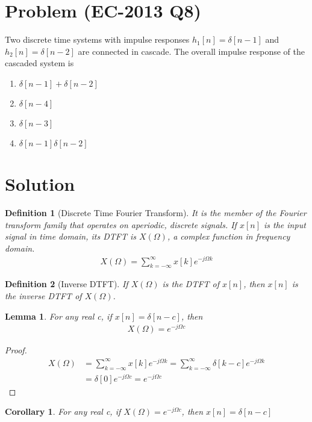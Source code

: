 \documentclass[journal,12pt,twocolumn]{IEEEtran}
\newtheorem{corollary}{Corollary}[theorem]
\newtheorem{lemma}[theorem]{Lemma}
\newtheorem{definition}{Definition}[section]
\begin{document}
\section{Problem (EC-2013 Q8)}
Two discrete time systems with impulse responses $h_1[n]=\delta[n-1]$ and $h_2[n]=\delta[n-2]$ are connected in cascade. The overall impulse response of the cascaded system is
\begin{enumerate}
    \item $\delta[n-1]+\delta[n-2]$
    \item $\delta[n-4]$
    \item $\delta[n-3]$
    \item $\delta[n-1]\delta[n-2]$
\end{enumerate}
\section{Solution}
\begin{definition}[Discrete Time Fourier Transform]
It is the member of the Fourier transform family that operates on aperiodic, discrete signals. If $x[n]$ is the input signal in time domain, its DTFT is $X(\Omega)$, a complex function in frequency domain.
\begin{align}
    X(\Omega)=\displaystyle\sum_{k=-\infty}^{\infty}x[k]e^{-j\Omega k} 
\end{align}
\end{definition}
\begin{definition}[Inverse DTFT]
If $X(\Omega)$ is the DTFT of $x[n]$, then $x[n]$ is the inverse DTFT of $X(\Omega)$.
\end{definition}
\begin{lemma}
For any real c, if $x[n]=\delta[n-c]$, then
\begin{align}
    X(\Omega)=e^{-j\Omega c}
    \label{eq:delta}
\end{align}
\end{lemma}
\begin{proof}
\begin{align}
     X(\Omega)&=\displaystyle\sum_{k=-\infty}^{\infty}x[k]e^{-j\Omega k}=\displaystyle\sum_{k=-\infty}^{\infty}\delta[k-c]e^{-j\Omega k}\\
     &=\delta[0]e^{-j\Omega c}=e^{-j\Omega c}
\end{align}
\end{proof}
\begin{corollary}
For any real c, if $X(\Omega)=e^{-j\Omega c}$, then $x[n]=\delta[n-c]$
\end{corollary}
\end{document}
